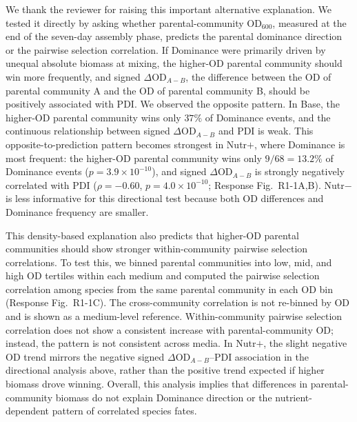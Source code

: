 \responselabel
We thank the reviewer for raising this important alternative explanation. We tested it directly by asking whether parental-community OD$_{600}$, measured at the end of the seven-day assembly phase, predicts the parental dominance direction or the pairwise selection correlation.
If Dominance were primarily driven by unequal absolute biomass at mixing, the higher-OD parental community should win more frequently, and signed $\Delta\text{OD}_{A-B}$, the difference between the OD of parental community A and the OD of parental community B, should be positively associated with PDI. We observed the opposite pattern. In Base, the higher-OD parental community wins only $37\%$ of Dominance events, and the continuous relationship between signed $\Delta\text{OD}_{A-B}$ and PDI is weak. This opposite-to-prediction pattern becomes strongest in Nutr$+$, where Dominance is most frequent: the higher-OD parental community wins only $9/68 = 13.2\%$ of Dominance events ($p = 3.9 \times 10^{-10}$), and signed $\Delta\text{OD}_{A-B}$ is strongly negatively correlated with PDI ($\rho = -0.60$, $p = 4.0 \times 10^{-10}$; Response Fig.~R1-1A,B). Nutr$-$ is less informative for this directional test because both OD differences and Dominance frequency are smaller.

This density-based explanation also predicts that higher-OD parental communities should show stronger within-community pairwise selection correlations. To test this, we binned parental communities into low, mid, and high OD tertiles within each medium and computed the pairwise selection correlation among species from the same parental community in each OD bin (Response Fig.~R1-1C). The cross-community correlation is not re-binned by OD and is shown as a medium-level reference. Within-community pairwise selection correlation does not show a consistent increase with parental-community OD; instead, the pattern is not consistent across media. In Nutr$+$, the slight negative OD trend mirrors the negative signed $\Delta\text{OD}_{A-B}$--PDI association in the directional analysis above, rather than the positive trend expected if higher biomass drove winning. Overall, this analysis implies that differences in parental-community biomass do not explain Dominance direction or the nutrient-dependent pattern of correlated species fates.

